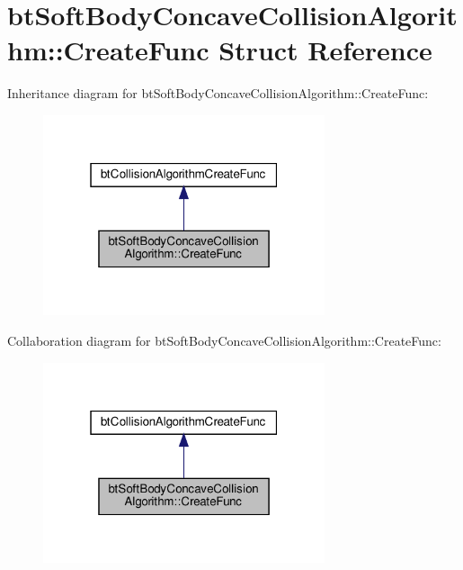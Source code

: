 \hypertarget{structbtSoftBodyConcaveCollisionAlgorithm_1_1CreateFunc}{}\section{bt\+Soft\+Body\+Concave\+Collision\+Algorithm\+:\+:Create\+Func Struct Reference}
\label{structbtSoftBodyConcaveCollisionAlgorithm_1_1CreateFunc}


Inheritance diagram for bt\+Soft\+Body\+Concave\+Collision\+Algorithm\+:\+:Create\+Func\+:
\nopagebreak
\begin{figure}[H]
\begin{center}
\leavevmode
\includegraphics[width=235pt]{structbtSoftBodyConcaveCollisionAlgorithm_1_1CreateFunc__inherit__graph}
\end{center}
\end{figure}


Collaboration diagram for bt\+Soft\+Body\+Concave\+Collision\+Algorithm\+:\+:Create\+Func\+:
\nopagebreak
\begin{figure}[H]
\begin{center}
\leavevmode
\includegraphics[width=235pt]{structbtSoftBodyConcaveCollisionAlgorithm_1_1CreateFunc__coll__graph}
\end{center}
\end{figure}
